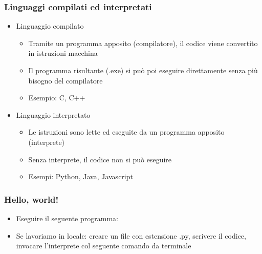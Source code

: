 \begin{exampleframe}
    \frametitle{Linguaggi compilati ed interpretati}

    \begin{itemize}
        \item Linguaggio compilato
        \begin{itemize}
            \item Tramite un programma apposito (compilatore), il codice viene convertito in istruzioni macchina
            \item Il programma risultante (.exe) si può poi eseguire direttamente senza più bisogno del compilatore
            \item Esempio: C, C++
        \end{itemize}

        \bigskip
        \item Linguaggio interpretato
        \begin{itemize}
            \item Le istruzioni sono lette ed eseguite da un programma apposito (interprete)
            \item Senza interprete, il codice non si può eseguire
            \item Esempi: Python, Java, Javascript
        \end{itemize}
    \end{itemize}
\end{exampleframe}

\begin{exerciseframe}
    \frametitle{Hello, world!}

    \begin{itemize}
        \item Eseguire il seguente programma: 

        \bigskip
        \item Se lavoriamo in locale: creare un file con estensione .py, scrivere il codice, invocare l'interprete col seguente comando da terminale 
    \end{itemize}
\end{exerciseframe}


